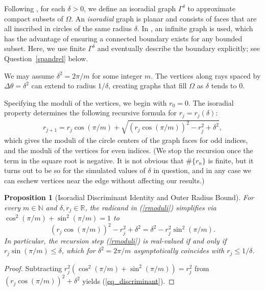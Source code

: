 \documentclass[11pt,reqno]{amsart}
\newtheorem{prop}[thm]{Proposition}
\numberwithin{equation}{section}
\newcommand{\R}{\mathbb{R}}
\newcommand{\N}{\mathbb{N}}
\begin{document}
Following \cite{CS}, for each $\delta > 0$, we define an isoradial graph $\varGamma^{\delta}$ to approximate compact subsets of $\varOmega$. An \textit{isoradial} graph is planar and consists of faces that are all inscribed in circles of the same radius $\delta$. In \cite{CS}, an infinite graph is used, which has the advantage of ensuring a connected boundary exists for any bounded subset. Here, we use finite $\varGamma^{\delta}$ and eventually describe the boundary explicitly; see Question~\ref{spandrel} below.

We may assume $\delta^2 = 2\pi/ m$ for some integer $m$.
The vertices along rays spaced by $\Delta \theta = \delta^2$ can extend to radius $1/\delta$, creating graphs that fill $\varOmega$ as $\delta$ tends to $0$.

Specifying the moduli of the vertices, we begin with $r_0 = 0$. The isoradial property determines the following recursive formula for $r_j = r_j(\delta)$:
\begin{align} \label{rmoduli}
    r_{j+1} = r_j\cos(\pi/m) + \sqrt{(r_j\cos(\pi/m))^2 - r_j^2 + \delta^2},
\end{align}
which gives the moduli of the circle centers of the graph faces for odd indices, and the moduli of the vertices for even indices. (We stop the recursion once the term in the square root is negative. It is not obvious that $\# \{r_n\}$ is finite, but it turns out to be so for the simulated values of $\delta$ in question, and in any case we can eschew vertices near the edge without affecting our results.)

\begin{prop}[Isoradial Discriminant Identity and Outer Radius Bound] \label{prop_discriminant}
For every $m \in \N$ and $\delta, r_j \in \R$, the radicand in (\ref{rmoduli}) simplifies via $\cos^2(\pi/m) + \sin^2(\pi/m) = 1$ to
\begin{equation} \label{eq_discriminant}
  (r_j \cos(\pi/m))^2 - r_j^2 + \delta^2 = \delta^2 - r_j^2 \sin^2(\pi/m).
\end{equation}
In particular, the recursion step (\ref{rmoduli}) is real-valued if and only if $r_j \sin(\pi/m) \le \delta$, which for $\delta^2 = 2\pi/m$ asymptotically coincides with $r_j \le 1/\delta$.
\end{prop}
\begin{proof}
Subtracting $r_j^2(\cos^2(\pi/m) + \sin^2(\pi/m)) = r_j^2$ from $(r_j\cos(\pi/m))^2 + \delta^2$ yields (\ref{eq_discriminant}).
\end{proof}
\end{document}
